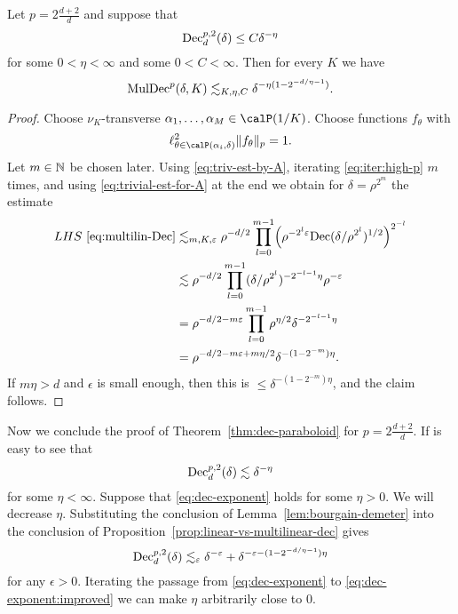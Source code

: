 \begin{lemma}\label{lem:bourgain-demeter}
Let $p = 2\frac{d+2}{d}$ and suppose that
\begin{equation}
\label{eq:40}
\mathrm{Dec}^{p,2}_{d}(\delta) \leq C \delta^{-\eta}
\end{equation}
for some $0<\eta<\infty$ and some $0<C<\infty$.
Then for every $K$ we have
\[
\mathrm{MulDec}^{p}(\delta,K) \lesssim_{K,\eta, C} \delta^{-\eta(1-2^{-d/\eta-1})}.
\]
\end{lemma}
\begin{proof}
Choose $\nu_{K}$-transverse $\alpha_{1},\dotsc,\alpha_{M} \in \Part{1/K}$.
Choose functions $f_{\theta}$ with
\[
\ell^{2}_{\theta \in \Part[\alpha_i]{\delta}} \norm{f_\theta}_{p} = 1.
\]
Let $m\in\mathbb{N}$ be chosen later.
Using \eqref{eq:triv-est-by-A}, iterating \eqref{eq:iter:high-p} $m$ times, and using \eqref{eq:trivial-est-for-A} at the end we obtain for $\delta = \rho^{2^{m}}$ the estimate
\begin{align*}
LHS~\eqref{eq:multilin-Dec}
&\lesssim_{m,K,\varepsilon}
\rho^{-d/2}
\prod_{l=0}^{m-1} \Bigl( \rho^{-2^{l}\varepsilon} \mathrm{Dec}(\delta/\rho^{2^{l}})^{1/2} \Bigr)^{2^{-l}}\\
&\lesssim
\rho^{-d/2} \prod_{l=0}^{m-1} (\delta/\rho^{2^{l}})^{-2^{-l-1}\eta} \rho^{-\varepsilon}\\
&=
\rho^{-d/2-m\varepsilon} \prod_{l=0}^{m-1} \rho^{\eta/2} \delta^{-2^{-l-1}\eta}\\
&=
\rho^{-d/2-m\varepsilon+m\eta/2} \delta^{-(1-2^{-m})\eta}.
\end{align*}
If $m\eta > d$ and $\epsilon$ is small enough, then this is $\leq \delta^{-(1-2^{-m})\eta}$, and the claim follows.
\end{proof}

Now we conclude the proof of Theorem~\ref{thm:dec-paraboloid} for $p = 2\frac{d+2}{d}$.
If is easy to see that
\begin{equation}\label{eq:dec-exponent}
\mathrm{Dec}^{p,2}_{d}(\delta) \lesssim \delta^{-\eta}
\end{equation}
for some $\eta<\infty$.
Suppose that \eqref{eq:dec-exponent} holds for some $\eta>0$.
We will decrease $\eta$.
Substituting the conclusion of Lemma~\ref{lem:bourgain-demeter} into the conclusion of Proposition~\ref{prop:linear-vs-multilinear-dec} gives
\begin{equation}\label{eq:dec-exponent:improved}
\mathrm{Dec}^{p,2}_{d}(\delta)
\lesssim_{\varepsilon} \delta^{-\varepsilon}
+
\delta^{-\varepsilon- (1 - 2^{-d/\eta-1}) \eta}
\end{equation}
for any $\epsilon>0$.
Iterating the passage from \eqref{eq:dec-exponent} to \eqref{eq:dec-exponent:improved} we can make $\eta$ arbitrarily close to $0$.
